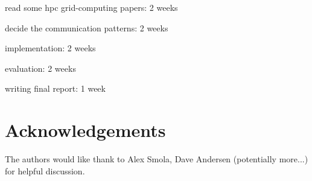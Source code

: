 \documentclass{acm_proc_article-sp}
\begin{document}
\begin{itemize*}
\item read some hpc grid-computing papers: 2 weeks
\item decide the communication patterns: 2 weeks
\item implementation: 2 weeks
\item evaluation: 2 weeks
\item writing final report: 1 week
\end{itemize*}

\appendix
\section{Acknowledgements}
The authors would like thank to Alex Smola, Dave Andersen (potentially more...)
for helpful discussion.



\end{document}
